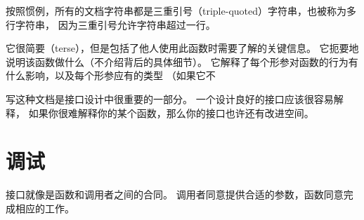 
按照惯例，所有的文档字符串都是三重引号（triple-quoted）字符串，也被称为多行字符串，
因为三重引号允许字符串超过一行。
  
  


它很简要（terse），但是包括了他人使用此函数时需要了解的关键信息。
它扼要地说明该函数做什么（不介绍背后的具体细节）。
它解释了每个形参对函数的行为有什么影响，以及每个形参应有的类型
（如果它不


写这种文档是接口设计中很重要的一部分。 一个设计良好的接口应该很容易解释，
如果你很难解释你的某个函数，那么你的接口也许还有改进空间。


\section{调试}
  


接口就像是函数和调用者之间的合同。
调用者同意提供合适的参数，函数同意完成相应的工作。


